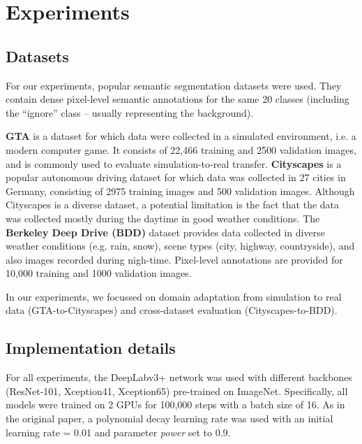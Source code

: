 \documentclass[conference]{IEEEtran}
\begin{document}
\section{Experiments}

\subsection{Datasets}
For our experiments, popular semantic segmentation datasets were used. They contain dense pixel-level semantic annotations for the same 20 classes (including the “ignore” class – usually representing the background). 

\textbf{GTA}\cite{playingfordata} is a dataset for which data were collected in a simulated environment, i.e. a modern computer game. It consists of 22,466 training and 2500 validation images, and is commonly used to evaluate simulation-to-real transfer. \textbf{Cityscapes} \cite{cityscapes} is a popular autonomous driving dataset for which data was collected in 27 cities in Germany, consisting of 2975 training images and 500 validation images. Although Cityscapes is a diverse dataset, a potential limitation is the fact that the data was collected mostly during the daytime in good weather conditions. The \textbf{Berkeley Deep Drive (BDD)} dataset \cite{bdd} provides data collected in diverse weather conditions (e.g. rain, snow), scene types (city, highway, countryside), and also images recorded during nigh-time. Pixel-level annotations are provided for 10,000 training and 1000 validation images. %

In our experiments, we focussed on domain adaptation from simulation to real data (GTA-to-Cityscapes) and cross-dataset evaluation (Cityscapes-to-BDD). 

\subsection{Implementation details}
For all experiments, the DeepLabv3+\cite{deeplab} network was used with different backbones (ResNet-101, Xception41, Xception65) pre-trained on ImageNet. Specifically, all models were trained on 2 GPUs for 100,000 steps with a batch size of 16.  As in the original paper, a polynomial decay learning rate was used with an initial learning rate = 0.01 and parameter \textit{power} set to 0.9. 
\end{document}

